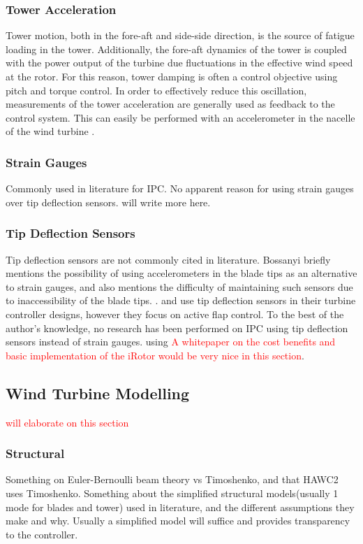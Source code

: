 \subsubsection{Tower Acceleration}
Tower motion, both in the fore-aft and side-side direction, is the source of fatigue loading in the tower. Additionally, the fore-aft dynamics of the tower is coupled with the power output of the turbine due fluctuations in the effective wind speed at the rotor. For this reason, tower damping is often a control objective using pitch and torque control. In order to effectively reduce this oscillation, measurements of the tower acceleration are generally used as feedback to the control system. This can easily be performed with an accelerometer in the nacelle of the wind turbine \cite{15_bossanyi}.
\subsubsection{Strain Gauges}
Commonly used in literature for IPC. No apparent reason for using strain gauges over tip deflection sensors. will write more here.
\subsubsection{Tip Deflection Sensors}
Tip deflection sensors are not commonly cited in literature. Bossanyi briefly mentions the possibility of using accelerometers in the blade tips as an alternative to strain gauges, and also mentions the difficulty of maintaining such sensors due to inaccessibility of the blade tips. \cite{5_Bossanyi} \cite{15_bossanyi}. \citet{7_Berg} and \citet{10_Wilson} use tip deflection sensors in their turbine controller designs, however they focus on active flap control. To the best of the author's knowledge, no research has been performed on IPC using tip deflection sensors instead of strain gauges. using \textcolor{red}{A whitepaper on the cost benefits and basic implementation of the iRotor would be very nice in this section}.
\subsection{Wind Turbine Modelling}
\textcolor{red}{will elaborate on this section}
\subsubsection{Structural}
Something on Euler-Bernoulli beam theory vs Timoshenko, and that HAWC2 uses Timoshenko. Something about the simplified structural models(usually 1 mode for blades and tower) used in literature, and the different assumptions they make and why. Usually a simplified model will suffice and provides transparency to the controller.

